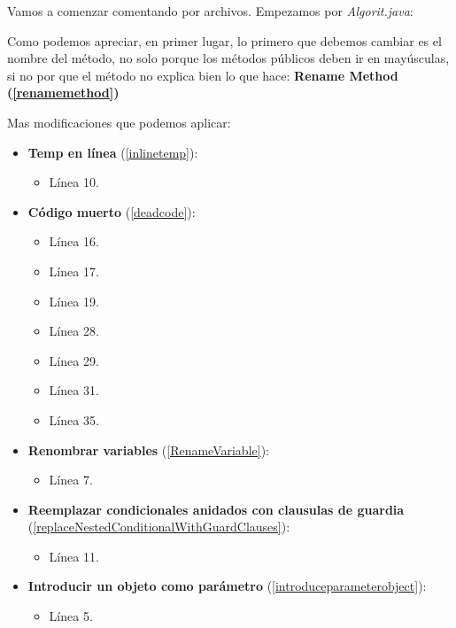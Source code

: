 \documentclass[11pt,a4paper,oneside]{book}
\begin{document}
Vamos a comenzar comentando por archivos.
Empezamos por \emph{Algorit.java}:



Como podemos apreciar, en primer lugar, lo primero que debemos cambiar es el nombre del método, no solo porque los métodos públicos deben ir en mayúsculas, si no por que el método no explica bien lo que hace: \textbf{Rename Method (\ref{renamemethod})}

\newline
Mas modificaciones que podemos aplicar:

\begin{itemize}
    \item \textbf{Temp en línea} (\ref{inlinetemp}):
    \begin{itemize}
        \item Línea 10.
    \end{itemize}
    
    \item \textbf{Código muerto} (\ref{deadcode}):
    \begin{itemize}
        \item Línea 16.
        \item Línea 17.
        \item Línea 19.
        \item Línea 28.
        \item Línea 29.
        \item Línea 31.
        \item Línea 35.
    \end{itemize}
    
    \item \textbf{Renombrar variables} (\ref{RenameVariable}):
    \begin{itemize}
        \item Línea 7.
    \end{itemize}
    
    \item \textbf{Reemplazar condicionales anidados con clausulas de guardia} (\ref{replaceNestedConditionalWithGuardClauses}):
    \begin{itemize}
        \item Línea 11.
    \end{itemize}
    
    \item \textbf{Introducir un objeto como parámetro} (\ref{introduceparameterobject}):
    \begin{itemize}
        \item Línea 5.
    \end{itemize}
\end{itemize}
\end{document}
